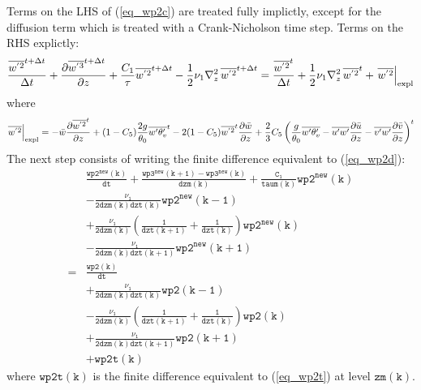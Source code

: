 \documentclass[11pt,fleqn]{article}
\newcommand{\ptlder}[2]{\frac{\partial #1}{\partial #2}}
\begin{document}
Terms on the LHS of (\ref{eq_wp2c}) are treated fully implictly, except
for the diffusion term which is treated with a Crank-Nicholson time step.
Terms on the RHS explictly:
%
\begin{equation}
\label{eq_wp2d}
\begin{split}
  \frac{\overline{w^{'2}}^{t+\Delta t}}{\Delta t} 
  + \ptlder{\overline{w^{'3}}^{t+\Delta t}}{z} 
  + \dfrac{C_1}{\tau} \overline{w^{'2}}^{t+\Delta t} 
  - \frac{1}{2} \nu_1 \nabla_z^2 \, \overline{w^{'2}}^{t+\Delta t}
=
  \frac{\overline{w^{'2}}^{t}}{\Delta t} 
  + \frac{1}{2} \nu_1 \nabla_z^2 \, \overline{w^{'2}}^t
  + \left. \overline{w^{'2}} \right|_{\rm expl}
\end{split}
\end{equation}
%
where
%
\begin{equation}
\label{eq_wp2t}
\left. \overline{w^{'2}} \right|_{\rm expl}
= 
  - \bar{w}\ptlder{\overline{w^{'2}}^{t}}{z}	 
  + ( 1 - C_5 ) \frac{2g}{\theta_0} \overline{w'\theta'_v}^{t}
  - 2 ( 1 - C_5 ) \overline{w^{'2}}^{t}\ptlder{\bar{w}}{z}
  + \frac{2}{3} C_5
     \left(
       \frac{g}{\theta_0} \overline{w'\theta'_v}
       - \overline{u'w'}\ptlder{\bar{u}}{z} 
       - \overline{v'w'}\ptlder{\bar{v}}{z} 
     \right)^{t}
\end{equation}
%
The next step consists of writing the finite difference equivalent to
(\ref{eq_wp2d}):
%
\begin{equation}
\label{eq_wp2e}
\begin{split}
& \mathtt{
  \frac{wp2^{new}(k)}{dt}
+ \frac{wp3^{new}(k+1) - wp3^{new}(k)}{dzm(k)}
+ \frac{C_1}{taum(k)} wp2^{new}(k)
  } \\
& \mathtt{
  -\frac{\nu_1}{2 dzm(k)dzt(k)} wp2^{new}(k-1)
  } \\
& \mathtt{
  +\frac{\nu_1}{2 dzm(k)} \left( \frac{1}{dzt(k+1)} + \frac{1}{dzt(k)} \right) wp2^{new}(k)
  } \\
& \mathtt{
  -\frac{\nu_1}{2 dzm(k)dzt(k+1)} wp2^{new}(k+1)
  } \\
=& \mathtt{
  \frac{wp2(k)}{dt}
  } \\
& \mathtt{
  +\frac{\nu_1}{2 dzm(k)dzt(k)} wp2(k-1)
  } \\
& \mathtt{
  -\frac{\nu_1}{2 dzm(k)} \left( \frac{1}{dzt(k+1)} + \frac{1}{dzt(k)} \right) wp2(k)
  } \\
& \mathtt{
  +\frac{\nu_1}{2 dzm(k)dzt(k+1)} wp2(k+1)
  } \\
& \mathtt{
  + wp2t(k)
  }
\end{split}
\end{equation}
%
where $\mathtt{wp2t(k)}$ is the finite difference equivalent to (\ref{eq_wp2t}) 
at level $\mathtt{zm(k)}$.
\end{document}
